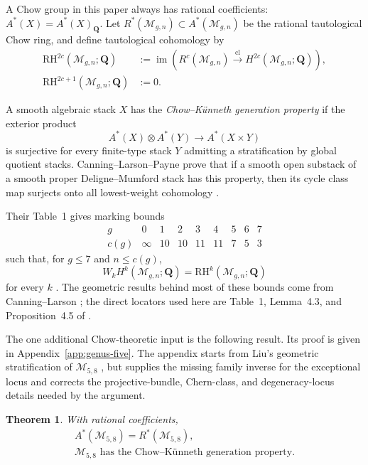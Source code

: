 \documentclass[12pt,reqno]{amsart}
\newcommand{\Q}{\mathbf{Q}}
\newcommand{\M}{\mathcal{M}}
\newcommand{\RH}{\mathrm{RH}}
\newcommand{\im}{\operatorname{im}}
\newtheorem{theorem}{Theorem}[section]
\theoremstyle{definition}
\theoremstyle{remark}
\begin{document}
A Chow group in this paper always has rational coefficients:
$A^*(X)=A^*(X)_{\Q}$.  Let $R^*(\M_{g,n})\subset A^*(\M_{g,n})$ be the
rational tautological Chow ring, and define tautological cohomology by
\begin{equation}\label{eq:RH-definition}
 \begin{aligned}
 \RH^{2c}(\M_{g,n};\Q)
 &:=\im\!\left(R^c(\M_{g,n})\xrightarrow{\mathrm{cl}}
 H^{2c}(\M_{g,n};\Q)\right),\\
 \RH^{2c+1}(\M_{g,n};\Q)&:=0.
 \end{aligned}
\end{equation}

A smooth algebraic stack $X$ has the \emph{Chow--K\"unneth generation
property} if the exterior product
\[
 A^*(X)\otimes A^*(Y)\longrightarrow A^*(X\times Y)
\]
is surjective for every finite-type stack $Y$ admitting a stratification by
global quotient stacks.  Canning--Larson--Payne prove that if a smooth open
substack of a smooth proper Deligne--Mumford stack has this property, then
its cycle class map surjects onto all lowest-weight cohomology
\cite[Lemma~4.3]{CLP}.

Their Table~1 gives marking bounds
\begin{equation}\label{eq:c-table}
\begin{array}{c|cccccccc}
g&0&1&2&3&4&5&6&7\\ \hline
c(g)&\infty&10&10&11&11&7&5&3
\end{array}
\end{equation}
such that, for $g\leq7$ and $n\leq c(g)$,
\begin{equation}\label{eq:CLP-pure-taut}
 W_kH^k(\M_{g,n};\Q)=\RH^k(\M_{g,n};\Q)
\end{equation}
for every $k$ \cite[Proposition~4.5]{CLP}.  The geometric results behind most
of these bounds come from Canning--Larson \cite{CanningLarsonStable}; the
direct locators used here are Table~1, Lemma~4.3, and Proposition~4.5 of
\cite{CLP}.

The one additional Chow-theoretic input is the following result.  Its proof
is given in Appendix~\ref{app:genus-five}.  The appendix starts from Liu's
geometric stratification of $\M_{5,8}$ \cite{Liu}, but supplies the missing
family inverse for the exceptional locus and corrects the projective-bundle,
Chern-class, and degeneracy-locus details needed by the argument.

\begin{theorem}\label{thm:genus-five-input}
With rational coefficients,
\[
 \begin{gathered}
 A^*(\M_{5,8})=R^*(\M_{5,8}),\\
 \M_{5,8}\text{ has the Chow--K\"unneth generation property}.
 \end{gathered}
\]
\end{theorem}
\end{document}
